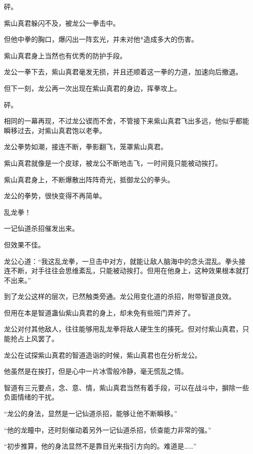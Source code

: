 \begin{this_body}
砰。

紫山真君躲闪不及，被龙公一拳击中。

但他中拳的胸口，爆闪出一阵玄光，并未对他*造成多大的伤害。

紫山真君身上当然也有优秀的防护手段。

龙公一拳下去，紫山真君毫发无损，并且还顺着这一拳的力道，加速向后撤退。

但下一刻，龙公再一次出现在紫山真君的身边，挥拳攻上。

砰。

相同的一幕再现，不过龙公锲而不舍，不管接下来紫山真君飞出多远，他似乎都能瞬移过去，对紫山真君饱以老拳。

龙公拳势如潮，接连不断，拳影翻飞，笼罩紫山真君。

紫山真君就像是一个皮球，被龙公不断地击飞，一时间竟只能被动挨打。

紫山真君身上，不断爆散出阵阵奇光，抵御龙公的拳头。

龙公的拳势，很快变得不再简单。

乱龙拳！

一记仙道杀招催发出来。

但效果不佳。

龙公心道：“我这乱龙拳，一旦击中对方，就能让敌人脑海中的念头混乱。拳头接连不断，对手往往会思维紊乱，只能被动挨打。但用在他身上，这种效果根本就打不出来。”

到了龙公这样的层次，已然触类旁通。龙公用变化道的杀招，附带智道良效。

但用在本是智道蛊仙紫山真君的身上，却未免有些班门弄斧了。

龙公对付其他敌人，往往能够用乱龙拳将敌人硬生生的揍死。但对付紫山真君，只能抢占上风罢了。

龙公在试探紫山真君的智道造诣的时候，紫山真君也在分析龙公。

他虽然是在挨打，但是心中一片冰雪般冷静，毫无慌乱之情。

智道有三元要点，念、意、情，紫山真君当然有着手段，可以在战斗中，摒除一些负面情绪的干扰。

“龙公的身法，显然是一记仙道杀招，能够让他不断瞬移。”

“他的龙瞳中，还时刻催动着另外一记仙道杀招，侦查能力非常的强。”

“初步推算，他的身法显然不是靠目光来指引方向的。难道是……”

\end{this_body}

